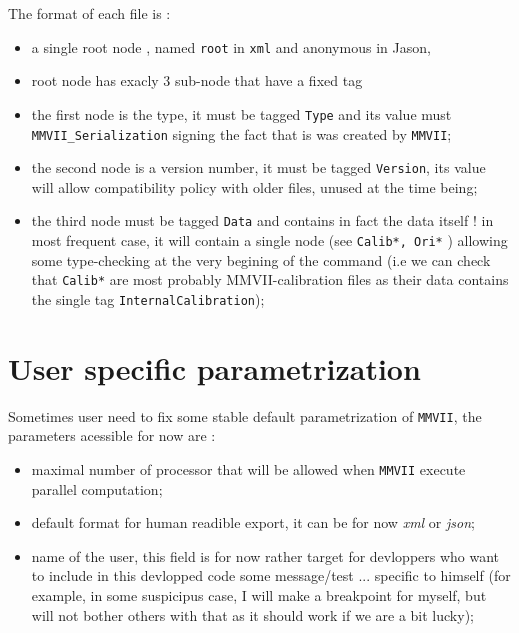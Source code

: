 The format of each file is :

\begin{itemize}
	\item a single root node , named {\tt root} in {\tt xml} and anonymous in Jason,
	\item root node has exacly $3$ sub-node that have  a fixed tag

	\item the first node is the type, it must be tagged {\tt Type} and its value must {\tt MMVII\_Serialization} 
              signing the fact that is was created by {\tt MMVII};

      \item the second node is a version number, it must be tagged {\tt Version}, its value will allow
	    compatibility policy with older files, unused at the time being;
             
    \item the third node must be tagged {\tt Data} and contains in fact the data itself !
          in most frequent case, it will contain a single node (see {\tt Calib*, Ori*} ) allowing
          some type-checking at the very begining   of the command (i.e we can check that {\tt Calib*}
          are most probably  MMVII-calibration files as their data contains the single tag {\tt InternalCalibration});
\end{itemize}



\section{User specific parametrization}

\label{UserParametrisation}

Sometimes user need to fix some stable default parametrization of {\tt MMVII}, 
the parameters acessible for now are :

\begin{itemize}
    \item maximal number of processor that will be allowed when  {\tt MMVII} execute
          parallel computation;

     \item default format for human readible export, it can be for now \emph{xml} or \emph{json};

      \item name of the user, this field is for now rather target for devloppers who want to
            include in this devlopped code   some message/test ...  specific to himself
           (for example, in some suspicipus case, I will make a breakpoint for myself, but will
		not bother others with that as it should work if we are a bit lucky);
\end{itemize}

